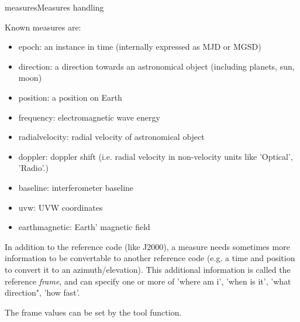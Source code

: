 \begin{ahmodule}{measures}{Measures handling}
\begin{ahdescription}
Known measures are:
\begin{itemize}
	\item epoch: an instance in time (internally expressed as MJD or MGSD)
	\item direction: a direction towards an astronomical object
(including planets, sun, moon)
	\item position: a position on Earth
	\item frequency: electromagnetic wave energy
	\item radialvelocity: radial velocity of astronomical object
	\item doppler: doppler shift (i.e. radial velocity in non-velocity
units like 'Optical', 'Radio'.)
	\item baseline: interferometer baseline
	\item uvw: UVW coordinates
	\item earthmagnetic: Earth' magnetic field
\end{itemize}

In addition to the reference code (like J2000), a measure needs sometimes more
information to be convertable to another reference code (e.g. a time and
position to convert it to an azimuth/elevation). This additional information
is called the reference {\em frame}, and can specify one or more of 'where am
i', 'when is it', 'what direction", 'how fast'.

The frame values can be set by the
 tool function.



\end{ahdescription}
\end{ahmodule}
